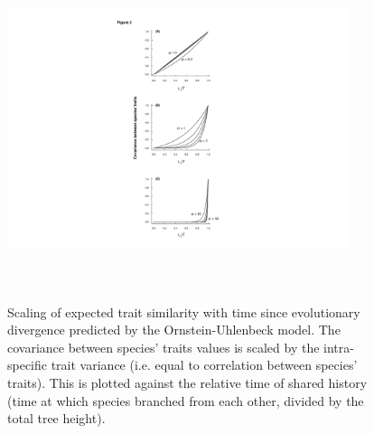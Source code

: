 \documentclass[a4paper,12pt]{article}
\begin{document}
\begin{figure}
\centering
    \includegraphics[width=10cm, height=10cm, keepaspectratio=true]{Figures/OU_figure2.pdf}
\caption{Scaling of expected trait similarity with time since evolutionary divergence predicted by the Ornstein-Uhlenbeck model. The covariance between species’ traits values is scaled by the intra-specific trait variance (i.e. equal to correlation between species’ traits). This is plotted against the relative time of shared history (time at which species branched from each other, divided by the total tree height). }
\label{figure.traitsim}
\end{figure}


\end{document}
